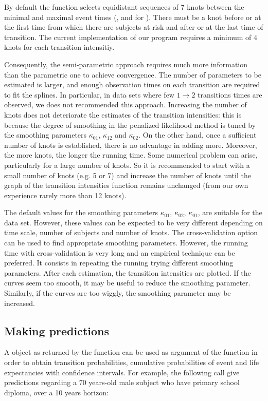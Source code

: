 \documentclass[article]{jss}
\begin{document}
By default the function  selects equidistant sequences of 7
knots between the minimal and maximal event times (, 
and  for ). There must be a knot before or at
the first time from which there are subjects at risk and after or at
the last time of transition. The current implementation of our program
requires a minimum of 4 knots for each transition intensitiy.


Consequently, the semi-parametric approach
requires much more information than the parametric one to achieve
convergence. The number of parameters to be estimated is larger, and
enough observation times on each transition are required to fit the
splines.  In particular, in data sets where few \(1 \rightarrow 2\)
transitions times are observed, we does not recommended this approach.
Increasing the number of knots does not deteriorate the estimates of
the transition intensities: this is because the degree of smoothing in
the penalized likelihood method is tuned by the smoothing parameters
\(\kappa_{01}\), \(\kappa_{12}\) and \(\kappa_{02}\).  On the other hand,
once a sufficient number of knots is established, there is no
advantage in adding more.  Moreover, the more knots, the longer the
running time.  Some numerical problem can arise, particularly for a
large number of knots. 
So it is recommended to start with a small number of
knots (e.g. 5 or 7) and increase the number of knots until the graph
of the transition intensities function remains unchanged (from our own
experience rarely more than 12 knots).

The default values for the smoothing parameters \(\kappa_{01}\), \(\kappa_{02}\), 
\(\kappa_{01}\), are suitable for the
 data set. However, these values can be expected to be
very different depending on time scale, number of subjects and number of knots. 
The cross-validation option can be used to find appropriate smoothing parameters.
However, the running time with cross-validation is very long and an empirical
technique can be preferred. It consists in repeating the  running
trying different smoothing parameters.  After each estimation, the
transition intensities are plotted. 
If the curves seem too smooth, it may be useful
to reduce the smoothing parameter. Similarly, if the curves
are too wiggly, the smoothing parameter may be increased.
\subsection{Making predictions}
\label{sec-5-4}
A object as returned by the  function 
can be used as argument of the  function in
order to obtain transition probabilities, cumulative probabilities of event and 
life expectancies with confidence intervals. 
For example, the following call give predictions regarding 
a 70 years-old male subject who have primary school diploma, 
over a 10 years horizon: 
\end{document}
